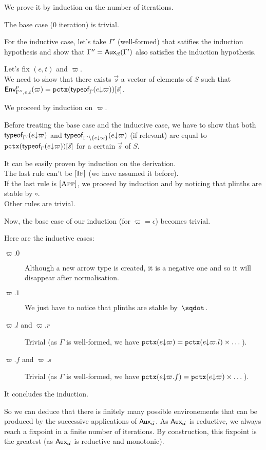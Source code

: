 \documentclass[a4paper]{article}
\theoremstyle{definition}
\begin{document}
    We prove it by induction on the number of iterations.

    The base case (0 iteration) is trivial.

    For the inductive case, let's take $\Gamma'$ (well-formed) that satifies the induction hypothesis
    and show that $\Gamma'' = \textsf{Aux}_{\vec \alpha}(\Gamma')$ also satisfies the induction hypothesis.

    Let's fix $(e,t)$ and $\varpi$.\\
    We need to show that there exists $\vec s$ a vector of elements of $S$ such that $\textsf{Env}^{p}_{\Gamma'',e,t} (\varpi) = \texttt{pctx}(\textsf{typeof}_{\Gamma}(e{\downarrow}\varpi))[\vec s]$.
    
    We proceed by induction on $\varpi$.

    Before treating the base case and the inductive case, we have to show that both $\textsf{typeof}_{\Gamma'}(e{\downarrow}\varpi)$
    and $\textsf{typeof}_{\Gamma'\setminus\{e{\downarrow}\varpi\}}(e{\downarrow}\varpi)$ (if relevant) are equal to $\texttt{pctx}(\textsf{typeof}_{\Gamma}(e{\downarrow}\varpi))[\vec s]$ for a certain $\vec s$ of $S$.

    It can be easily proven by induction on the derivation.\\
    The last rule can't be $[\textsc{If}]$ (we have assumed it before).\\
    If the last rule is $[\textsc{App}]$, we proceed by induction and by noticing that plinths are stable by $\circ$.\\
    Other rules are trivial.

    Now, the base case of our induction (for $\varpi=\epsilon$) becomes trivial.

    Here are the inductive cases:
    \begin{description}
      \item[$\varpi.0$] Although a new arrow type is created, it is a negative one and so it will disappear after normalisation.
      \item[$\varpi.1$] We just have to notice that plinths are stable by $\worra {} {}$.
      \item[$\varpi.l$ and $\varpi.r$] Trivial (as $\Gamma$ is well-formed, we have $\texttt{pctx}(e{\downarrow}\varpi) = \texttt{pctx}(e{\downarrow}\varpi.l)\times \dots$).
      \item[$\varpi.f$ and $\varpi.s$] Trivial (as $\Gamma$ is well-formed, we have $\texttt{pctx}(e{\downarrow}\varpi.f) = \texttt{pctx}(e{\downarrow}\varpi)\times \dots$).
    \end{description}

    It concludes the induction.

    So we can deduce that there is finitely many possible environements that can be produced by the successive applications of $\textsf{Aux}_{\vec \alpha}$.
    As $\textsf{Aux}_{\vec \alpha}$ is reductive, we always reach a fixpoint in a finite number of iterations.
    By construction, this fixpoint is the greatest (as $\textsf{Aux}_{\vec \alpha}$ is reductive and monotonic).
\end{document}
